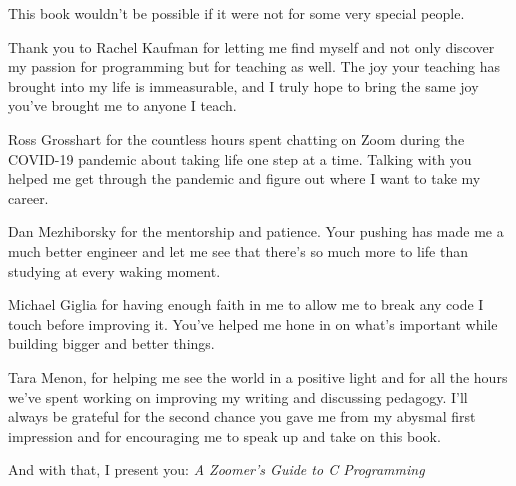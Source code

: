 %


\thispagestyle{empty}

\begingroup
\hspace{0pt}
\vfill
\noindent
This book wouldn't be possible if it were not for some very special
people.

\vspace{0.5em}

\noindent
Thank you to Rachel Kaufman for letting me find myself and not only
discover my passion for programming but for teaching as well.  The joy
your teaching has brought into my life is immeasurable, and I truly hope
to bring the same joy you've brought me to anyone I teach.

\vspace{0.5em}

\noindent
Ross Grosshart for the countless hours spent chatting on Zoom during the
COVID-19 pandemic about taking life one step at a time.  Talking with
you helped me get through the pandemic and figure out where I want to
take my career.

\vspace{0.5em}

\noindent
Dan Mezhiborsky for the mentorship and patience.  Your pushing has made
me a much better engineer and let me see that there's so much more to
life than studying at every waking moment.

\vspace{0.5em}

\noindent
Michael Giglia for having enough faith in me to allow me to break any
code I touch before improving it.  You've helped me hone in on what's
important while building bigger and better things.

\vspace{0.5em}

\noindent
Tara Menon, for helping me see the world in a positive light and for all
the hours we've spent working on improving my writing and discussing
pedagogy.  I'll always be grateful for the second chance you gave me
from my abysmal first impression and for encouraging me to speak up and
take on this book.

\vspace{0.5em}

\noindent
And with that, I present you: \emph{A Zoomer's Guide to C Programming}
\vfill
\hspace{0pt}
\endgroup

\cleardoublepage
